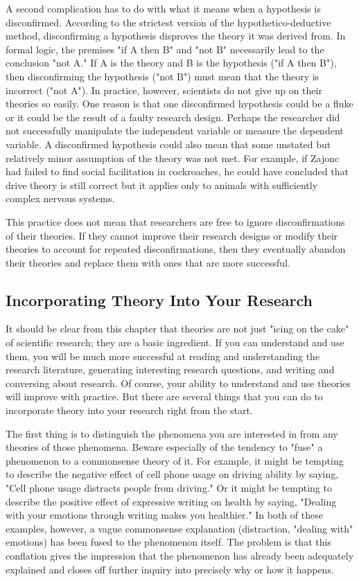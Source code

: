 A second complication has to do with what it means when a hypothesis is disconfirmed. According to the strictest version of the hypothetico-deductive method, disconfirming a hypothesis disproves the theory it was derived from. In formal logic, the premises "if A then B" and "not B" necessarily lead to the conclusion "not A." If A is the theory and B is the hypothesis ("if A then B"), then disconfirming the hypothesis ("not B") must mean that the theory is incorrect ("not A"). In practice, however, scientists do not give up on their theories so easily. One reason is that one disconfirmed hypothesis could be a fluke or it could be the result of a faulty research design. Perhaps the researcher did not successfully manipulate the independent variable or measure the dependent variable. A disconfirmed hypothesis could also mean that some unstated but relatively minor assumption of the theory was not met. For example, if Zajonc had failed to find social facilitation in cockroaches, he could have concluded that drive theory is still correct but it applies only to animals with sufficiently complex nervous systems.


This practice does not mean that researchers are free to ignore disconfirmations of their theories. If they cannot improve their research designs or modify their theories to account for repeated disconfirmations, then they eventually abandon their theories and replace them with ones that are more successful.


\subsection{Incorporating Theory Into Your Research}


It should be clear from this chapter that theories are not just "icing on the cake" of scientific research; they are a basic ingredient. If you can understand and use them, you will be much more successful at reading and understanding the research literature, generating interesting research questions, and writing and conversing about research. Of course, your ability to understand and use theories will improve with practice. But there are several things that you can do to incorporate theory into your research right from the start.

The first thing is to distinguish the phenomena you are interested in from any theories of those phenomena. Beware especially of the tendency to "fuse" a phenomenon to a commonsense theory of it. For example, it might be tempting to describe the negative effect of cell phone usage on driving ability by saying, "Cell phone usage distracts people from driving." Or it might be tempting to describe the positive effect of expressive writing on health by saying, "Dealing with your emotions through writing makes you healthier." In both of these examples, however, a vague commonsense explanation (distraction, "dealing with" emotions) has been fused to the phenomenon itself. The problem is that this conflation gives the impression that the phenomenon has already been adequately explained and closes off further inquiry into precisely why or how it happens.


